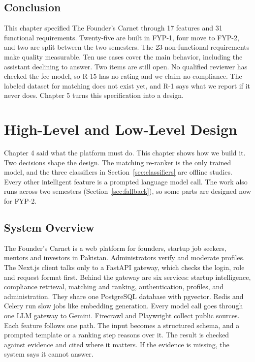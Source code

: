 \documentclass{FastFyp}
\begin{document}
\section{Conclusion}
This chapter specified The Founder's Carnet through 17 features and 31 functional requirements. Twenty-five are built in FYP-1, four move to FYP-2, and two are split between the two semesters. The 23 non-functional requirements make quality measurable. Ten use cases cover the main behavior, including the assistant declining to answer. Two items are still open. No qualified reviewer has checked the fee model, so R-15 has no rating and we claim no compliance. The labeled dataset for matching does not exist yet, and R-1 says what we report if it never does. Chapter 5 turns this specification into a design.

\chapter{High-Level and Low-Level Design}
Chapter 4 said what the platform must do. This chapter shows how we build it. Two decisions shape the design. The matching re-ranker is the only trained model, and the three classifiers in Section~\ref{sec:classifiers} are offline studies. Every other intelligent feature is a prompted language model call. The work also runs across two semesters (Section~\ref{sec:fallback}), so some parts are designed now for FYP-2.

\section{System Overview}
The Founder's Carnet is a web platform for founders, startup job seekers, mentors and investors in Pakistan. Administrators verify and moderate profiles. The Next.js client talks only to a FastAPI gateway, which checks the login, role and request format first. Behind the gateway are six services: startup intelligence, compliance retrieval, matching and ranking, authentication, profiles, and administration. They share one PostgreSQL database with pgvector. Redis and Celery run slow jobs like embedding generation. Every model call goes through one LLM gateway to Gemini. Firecrawl and Playwright collect public sources. Each feature follows one path. The input becomes a structured schema, and a prompted template or a ranking step reasons over it. The result is checked against evidence and cited where it matters. If the evidence is missing, the system says it cannot answer.
\end{document}
